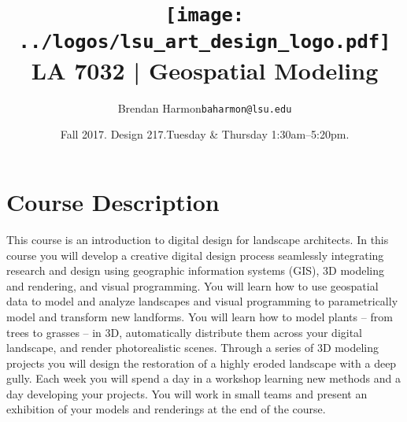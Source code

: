 \documentclass[11pt,article,oneside]{memoir}
\makeatletter
\def\myauthor{Author}
\def\mytitle{Title}
\def\myemail{baharmon@lsu.edu}
\def\myauthor{Brendan Harmon}
\def\mytitle{ \texttt{[image: ../logos/lsu\_art\_design\_logo.pdf]} \\[0.1cm] {\normalfont \normalsize LA 7032 |} \Large Geospatial Modeling}
\newcommand{\globalcolor}[1]{%
  \color{#1}\global\let\default@color\current@color
}
\makeatother
\begin{document}
\setlength\bibitemsep{0.75em}

\setmainfont[Scale=1, Path = ../fonts/lato/,BoldItalicFont=Lato-RegIta,BoldFont=Lato-Reg,ItalicFont=Lato-LigIta]{Lato-Lig}
\setsansfont[Scale=1, Path = ../fonts/lato/,BoldItalicFont=Lato-RegIta,BoldFont=Lato-Reg,ItalicFont=Lato-LigIta]{Lato-Lig}
\setmonofont[Mapping=tex-text,Scale=0.8,Path = ../fonts/inconsolata/]{i}

\def\ind{\hangindent=1 true cm\hangafter=1 \noindent}
\def\labelitemi{$\cdot$}
\title{\LARGE \mytitle}     
\author{\Large\myauthor \newline \footnotesize\texttt{\noindent\myemail}}
\date{Fall 2017. Design 217.\newline Tuesday \& Thursday 1:30am--5:20pm.}
\published{\,}


\globalcolor{black}
\vspace*{-10em}
\maketitle
{}
\clearpage


\globalcolor{black}
\vspace*{-10em}
\maketitle

\section{Course Description}

This course is an introduction to digital design for landscape architects. 
%
In this course you will develop a creative digital design process 
seamlessly integrating research and design
using geographic information systems (GIS),
3D modeling and rendering, and
visual programming. 
%
You will learn how to use geospatial data 
to model and analyze landscapes
and visual programming to 
parametrically model and transform new landforms. 
%
You will learn how to model plants -- from trees to grasses -- in 3D, 
automatically distribute them across your digital landscape,
and render photorealistic scenes. 
%
Through a series of 3D modeling projects you will 
design the restoration of a highly eroded landscape with a deep gully.
%
Each week you will spend a day in a workshop
learning new methods
and a day developing your projects.
%
You will work in small teams and present an exhibition of your
models and renderings at the end of the course.\\
\end{document}
